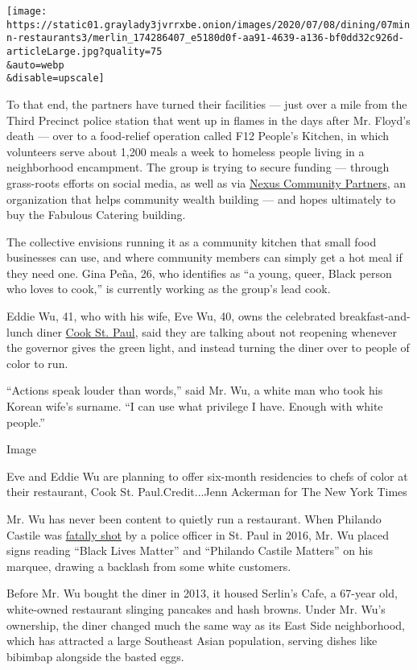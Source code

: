 \texttt{[image: https://static01.graylady3jvrrxbe.onion/images/2020/07/08/dining/07minn-restaurants3/merlin\_174286407\_e5180d0f-aa91-4639-a136-bf0dd32c926d-articleLarge.jpg?quality=75\\\&auto=webp\\\&disable=upscale]}

To that end, the partners have turned their facilities --- just over a
mile from the Third Precinct police station that went up in flames in
the days after Mr. Floyd's death --- over to a food-relief operation
called F12 People's Kitchen, in which volunteers serve about 1,200 meals
a week to homeless people living in a neighborhood encampment. The group
is trying to secure funding --- through grass-roots efforts on social
media, as well as via
\href{https://www.google.com/search?q=nexus+community+partners\&oq=Nexus+Community+Partners\&aqs=chrome.0.0j46j0l2.343j0j9\&sourceid=chrome\&ie=UTF-8}{Nexus
Community Partners}, an organization that helps community wealth
building --- and hopes ultimately to buy the Fabulous Catering building.

The collective envisions running it as a community kitchen that small
food businesses can use, and where community members can simply get a
hot meal if they need one. Gina Peña, 26, who identifies as ``a young,
queer, Black person who loves to cook,'' is currently working as the
group's lead cook.

Eddie Wu, 41, who with his wife, Eve Wu, 40, owns the celebrated
breakfast-and-lunch diner \href{http://www.cookstp.com/}{Cook St. Paul},
said they are talking about not reopening whenever the governor gives
the green light, and instead turning the diner over to people of color
to run.

``Actions speak louder than words,'' said Mr. Wu, a white man who took
his Korean wife's surname. ``I can use what privilege I have. Enough
with white people.''

Image

Eve and Eddie Wu are planning to offer six-month residencies to chefs of
color at their restaurant, Cook St. Paul.Credit...Jenn Ackerman for The
New York Times

Mr. Wu has never been content to quietly run a restaurant. When Philando
Castile was
\href{https://www.nytimes3xbfgragh.onion/2017/06/21/us/video-police-shooting-philando-castile-trial.html}{fatally
shot} by a police officer in St. Paul in 2016, Mr. Wu placed signs
reading ``Black Lives Matter'' and ``Philando Castile Matters'' on his
marquee, drawing a backlash from some white customers.

Before Mr. Wu bought the diner in 2013, it housed Serlin's Cafe, a
67-year old, white-owned restaurant slinging pancakes and hash browns.
Under Mr. Wu's ownership, the diner changed much the same way as its
East Side neighborhood, which has attracted a large Southeast Asian
population, serving dishes like bibimbap alongside the basted eggs.

